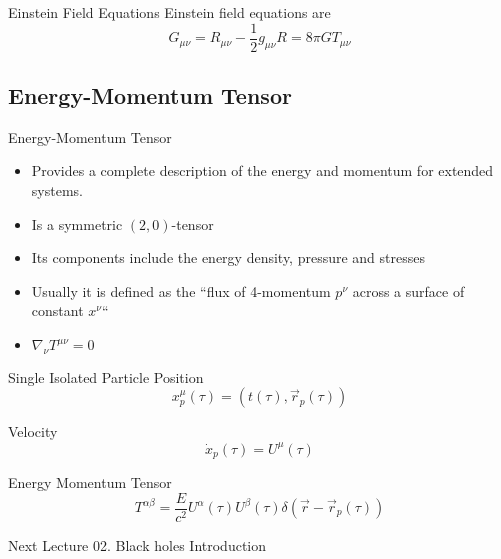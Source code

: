 \documentclass{beamer}
\begin{document}
\begin{darkframes}
    \begin{frame}{Einstein Field Equations}
    	Einstein field equations are 
		$$ G_{\mu\nu} = R_{\mu\nu} - \frac{1}{2}g_{\mu\nu}R = 8\pi GT_{\mu\nu} $$
    \end{frame}
    
    
    \subsection{Energy-Momentum Tensor}  
    \begin{frame}{Energy-Momentum Tensor}
		\begin{itemize}
			\item Provides a complete description of the energy and momentum for extended
systems.
			\item Is a symmetric $\left(2,0\right)$-tensor
			\item Its components include the energy density, pressure and stresses
			\item Usually it is defined as the ``flux of 4-momentum $p^{\nu}$ across
a surface of constant $x^{\nu}$``
			\item $ \nabla_\nu T^{\mu\nu} = 0$
		\end{itemize}
	\end{frame}
    
    \begin{frame}{Single Isolated Particle}
		Position   	
        $$x_{p}^{\mu}\left(\tau\right) = \left(t\left(\tau\right),\vec{r}_{p}\left(\tau\right)\right)$$
        
		\pause
        Velocity 
        $$\dot{x}_{p}\left(\tau\right) = U^{\mu}\left(\tau\right)$$
        
		\pause        
        Energy Momentum Tensor
		$$
		T^{\alpha\beta} = \frac{E}{c^{2}}U^{\alpha}\left(\tau\right)U^{\beta}\left(\tau\right)\delta\left(\vec{r}-	\vec{r}_{p}\left(\tau\right)\right)
		$$
	\end{frame}
    
    
		\begin{frame}{Next Lecture}
        	\Large
			{02. Black holes Introduction}
		\end{frame}
  \end{darkframes}
\end{document}
